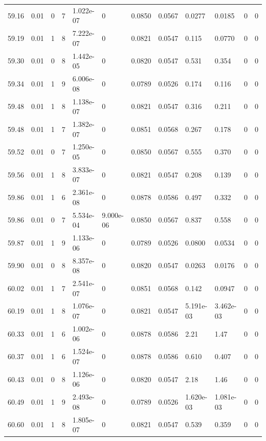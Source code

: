 \documentclass[preview]{standalone}
\begin{document}
{{{{{{{{{{{{{{{{\begin{tabular}{L{1.2cm}C{1.2cm} C{0.3cm}C{0.5cm} C{1.4cm}C{1.4cm} C{1.4cm}C{1.4cm} C{1.6cm}C{1.6cm} C{1.6cm}C{1.6cm}}
  59.16  &  0.01  & 0     &  7 &  1.022e-07  & 0  &  0.0850&   0.0567& 0.0277 & 0.0185   &  0 & 0  \\ 
  59.19  &  0.01  & 1     &  8 &  7.222e-07  & 0  &  0.0821&   0.0547& 0.115 & 0.0770   &  0 & 0  \\ 
  59.30  &  0.01  & 0     &  8 &  1.442e-05  & 0  &  0.0820&   0.0547& 0.531 & 0.354   &  0 & 0  \\ 
  59.34  &  0.01  & 1     &  9 &  6.006e-08  & 0  &  0.0789&   0.0526& 0.174 & 0.116   &  0 & 0  \\ 
  59.48  &  0.01  & 1     &  8 &  1.138e-07  & 0  &  0.0821&   0.0547& 0.316 & 0.211   &  0 & 0  \\ 
  59.48  &  0.01  & 1     &  7 &  1.382e-07  & 0  &  0.0851&   0.0568& 0.267 & 0.178   &  0 & 0  \\ 
  59.52  &  0.01  & 0     &  7 &  1.250e-05  & 0  &  0.0850&   0.0567& 0.555 & 0.370   &  0 & 0  \\ 
  59.56  &  0.01  & 1     &  8 &  3.833e-07  & 0  &  0.0821&   0.0547& 0.208 & 0.139   &  0 & 0  \\ 
  59.86  &  0.01  & 1     &  6 &  2.361e-08  & 0  &  0.0878&   0.0586& 0.497 & 0.332   &  0 & 0  \\ 
  59.86  &  0.01  & 0     &  7 &  5.534e-04  & 9.000e-06  &  0.0850&   0.0567& 0.837 & 0.558   &  0 & 0  \\ 
  59.87  &  0.01  & 1     &  9 &  1.133e-06  & 0  &  0.0789&   0.0526& 0.0800 & 0.0534   &  0 & 0  \\ 
  59.90  &  0.01  & 0     &  8 &  8.357e-08  & 0  &  0.0820&   0.0547& 0.0263 & 0.0176   &  0 & 0  \\ 
  60.02  &  0.01  & 1     &  7 &  2.541e-07  & 0  &  0.0851&   0.0568& 0.142 & 0.0947   &  0 & 0  \\ 
  60.19  &  0.01  & 1     &  8 &  1.076e-07  & 0  &  0.0821&   0.0547& 5.191e-03 & 3.462e-03   &  0 & 0  \\ 
  60.33  &  0.01  & 1     &  6 &  1.002e-06  & 0  &  0.0878&   0.0586& 2.21 & 1.47   &  0 & 0  \\ 
  60.37  &  0.01  & 1     &  6 &  1.524e-07  & 0  &  0.0878&   0.0586& 0.610 & 0.407   &  0 & 0  \\ 
  60.43  &  0.01  & 0     &  8 &  1.126e-06  & 0  &  0.0820&   0.0547& 2.18 & 1.46   &  0 & 0  \\ 
  60.49  &  0.01  & 1     &  9 &  2.493e-08  & 0  &  0.0789&   0.0526& 1.620e-03 & 1.081e-03   &  0 & 0  \\ 
  60.60  &  0.01  & 1     &  8 &  1.805e-07  & 0  &  0.0821&   0.0547& 0.539 & 0.359   &  0 & 0  \\ 

\end{tabular}}}}}}}}}}}}}}}}}
\end{document}
